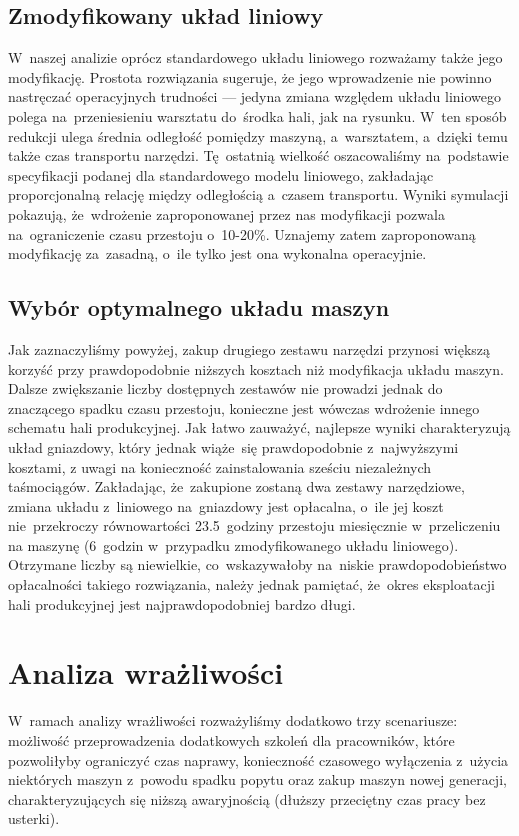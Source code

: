 \documentclass[12pt, a4paper, oneside]{mwart} %
\begin{document}
\subsection{Zmodyfikowany układ liniowy}
W~naszej analizie oprócz standardowego układu liniowego rozważamy także jego modyfikację. Prostota rozwiązania sugeruje, że jego wprowadzenie nie powinno nastręczać operacyjnych trudności --- jedyna zmiana względem układu liniowego polega na~przeniesieniu warsztatu do~środka hali, jak na rysunku. W~ten sposób redukcji ulega średnia odległość pomiędzy maszyną, a~warsztatem, a~dzięki temu także czas transportu narzędzi. Tę~ostatnią wielkość oszacowaliśmy na~podstawie specyfikacji podanej dla standardowego modelu liniowego, zakładając proporcjonalną relację między odległością a~czasem transportu. Wyniki symulacji pokazują, że~wdrożenie zaproponowanej przez nas modyfikacji pozwala na~ograniczenie czasu przestoju o~10-20\%. Uznajemy zatem zaproponowaną modyfikację za~zasadną, o~ile tylko jest ona wykonalna operacyjnie.

\subsection{Wybór optymalnego układu maszyn}
Jak zaznaczyliśmy powyżej, zakup drugiego zestawu narzędzi przynosi większą korzyść przy prawdopodobnie niższych kosztach niż modyfikacja układu maszyn. Dalsze zwiększanie liczby dostępnych zestawów nie prowadzi jednak do znaczącego spadku czasu przestoju, konieczne jest wówczas wdrożenie innego schematu hali produkcyjnej. Jak łatwo zauważyć, najlepsze wyniki charakteryzują układ gniazdowy, który jednak wiąże~się prawdopodobnie z~najwyższymi kosztami, z uwagi na konieczność zainstalowania sześciu niezależnych taśmociągów. Zakładając, że~zakupione zostaną dwa zestawy narzędziowe, zmiana układu z~liniowego na~gniazdowy jest opłacalna, o~ile jej koszt nie~przekroczy równowartości 23.5~godziny przestoju miesięcznie w~przeliczeniu na maszynę (6~godzin w~przypadku zmodyfikowanego układu liniowego). Otrzymane liczby są niewielkie, co~wskazywałoby na~niskie prawdopodobieństwo opłacalności takiego rozwiązania, należy jednak pamiętać, że~okres eksploatacji hali produkcyjnej jest najprawdopodobniej bardzo długi.

\section{Analiza wrażliwości}
W~ramach analizy wrażliwości rozważyliśmy dodatkowo trzy scenariusze: możliwość przeprowadzenia dodatkowych szkoleń dla pracowników, które pozwoliłyby ograniczyć czas naprawy, konieczność czasowego wyłączenia z~użycia niektórych maszyn z~powodu spadku popytu oraz zakup maszyn nowej generacji, charakteryzujących się niższą awaryjnością (dłuższy przeciętny czas pracy bez usterki).
\end{document}
